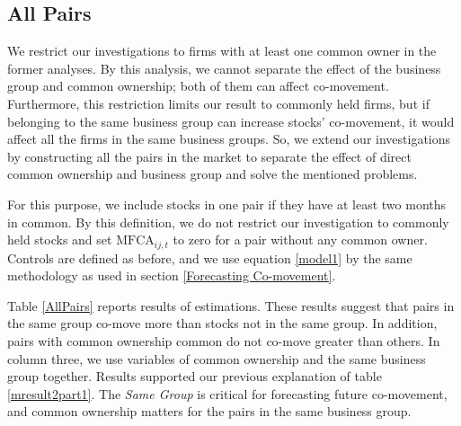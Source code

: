 		

				
				
				\FloatBarrier
				
				\subsection{All Pairs}
				
We restrict our investigations to firms with at least one common owner in the former analyses. By this analysis, we cannot separate the effect of the business group and common ownership; both of them can affect co-movement. Furthermore, this restriction limits our result to commonly held firms, but if belonging to the same business group can increase stocks' co-movement, it would affect all the firms in the same business groups. 	So, we extend our investigations by constructing all the pairs in the market to separate the effect of direct common ownership and business group and solve the mentioned problems. 
	
	For this purpose, we include stocks in one pair if they have at least two months in common. By this definition, we do not restrict our investigation to commonly held stocks and set $\text{MFCA}_{ij,t}$ to zero for a pair without any common owner. Controls are defined as before, and we use equation \ref{model1} by the same methodology as used in section \ref{Forecasting Co-movement}.
	
	Table \ref{AllPairs} reports results of estimations. These results suggest that pairs in the same group co-move more than stocks not in the same group. In addition, pairs with common ownership common do not co-move greater than others. In column three, we use variables of common ownership and the same business group together. Results supported our previous explanation of table \ref{mresult2part1}. The \textit{Same Group} is critical for forecasting future co-movement, and common ownership matters for the pairs in the same business group.
					
